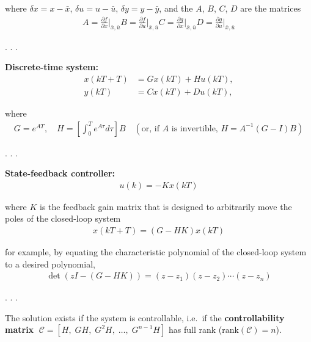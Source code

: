 \documentclass[
  letterpaper,
  DIV=11,
  numbers=noendperiod,
  oneside]{scrartcl}
\begin{document}
where \(\delta x = x - \bar x\), \(\delta u = u - \bar u\),
\(\delta y = y - \bar y\), and the \(A\), \(B\), \(C\), \(D\) are the
matrices \[ 
\begin{align*}
A = \frac{\partial f}{\partial x} \bigg|_{\bar x, \bar u}
B = \frac{\partial f}{\partial u} \bigg|_{\bar x, \bar u}
C = \frac{\partial g}{\partial x} \bigg|_{\bar x, \bar u}
D = \frac{\partial g}{\partial u} \bigg|_{\bar x, \bar u} 
\end{align*}
\]

. . .

\textbf{Discrete-time system:} \[
\begin{align*} x(kT+T) &= Gx(kT) + Hu(kT), \\ y(kT) &= Cx(kT) + Du(kT), \end{align*}
\]

where \[
\begin{align*}
G = e^{AT}, \quad H = \left[\int_0^T e^{A\tau} d\tau\right] B \quad \left(\text{or, if $A$ is invertible, } H = A^{-1} (G-I)B\right)
\end{align*}
\]

. . .

\textbf{State-feedback controller:} \[ 
\begin{align*}
u(k) = -Kx(kT) 
\end{align*}
\]

where \(K\) is the feedback gain matrix that is designed to arbitrarily
move the poles of the closed-loop system \[
\begin{align*}
x(kT+T) = (G-HK)x(kT)
\end{align*}
\]

for example, by equating the characteristic polynomial of the
closed-loop system to a desired polynomial, \[
\begin{align*}
\det(zI - (G-HK)) = (z - z_1)(z - z_2) \cdots (z - z_n) 
\end{align*}
\]

. . .

\begin{tcolorbox}[enhanced jigsaw, rightrule=.15mm, coltitle=black, titlerule=0mm, breakable, title=\textcolor{quarto-callout-important-color}{\faExclamation}\hspace{0.5em}{Important}, bottomrule=.15mm, colback=white, toprule=.15mm, opacityback=0, opacitybacktitle=0.6, leftrule=.75mm, left=2mm, colbacktitle=quarto-callout-important-color!10!white, bottomtitle=1mm, toptitle=1mm, arc=.35mm, colframe=quarto-callout-important-color-frame]

The solution exists if the system is controllable, i.e.~if the
\textbf{controllability matrix}
\(\;\mathcal{C} = \left[H,\; GH,\; G^2H,\; \ldots,\; G^{n-1}H\right]\)
has full rank (\(\text{rank}(\mathcal{C})=n\)).

\end{tcolorbox}
\end{document}
